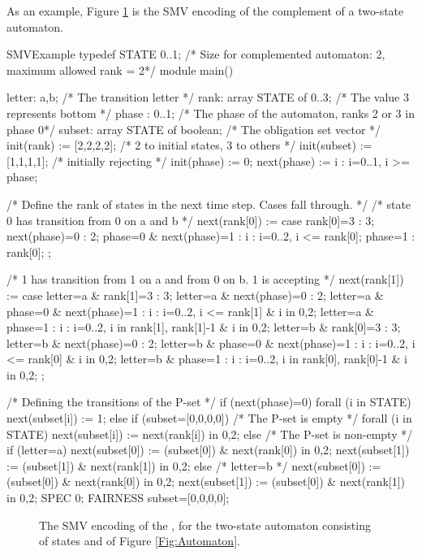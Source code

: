 \documentclass{LMCS}
\begin{document}
As an example, Figure \ref{Fig:SMV_Encoding} is the SMV encoding of the complement of a two-state automaton.


{
\begin{SaveVerbatim}{SMVExample}
typedef STATE 0..1;  /* Size for complemented automaton: 2, maximum allowed rank = 2*/
module main() { 
 letter: {a,b};                   /* The transition letter */
 rank: array STATE of 0..3;       /* The value 3 represents bottom */
 phase : 0..1;                    /* The phase of the automaton, ranks 2 or 3 in phase 0*/
 subset: array STATE of boolean;  /* The obligation set vector */
 init(rank) := [2,2,2,2];         /* 2 to initial states, 3 to others */
 init(subset) := [1,1,1,1];       /* initially rejecting */
 init(phase) := 0;
 next(phase) := {i : i=0..1, i >= phase}; 

 /* Define the rank of states in the next time step. Cases fall through. */
 /* state 0 has transition from 0 on a and b */
 next(rank[0]) := case {
     rank[0]=3 : 3;
     next(phase)=0 : 2; 
     phase=0 & next(phase)=1 : {i : i=0..2, i <= rank[0]};
     phase=1 : rank[0];
 };

 /* 1 has transition from 1 on a and from 0 on b. 1 is accepting */
 next(rank[1]) := case {
    letter=a & rank[1]=3 : 3;
    letter=a & next(phase)=0 : 2;
    letter=a & phase=0 & next(phase)=1 : {i : i=0..2, i <= rank[1] & i in {0,2}};
    letter=a & phase=1 : {i : i=0..2, i in {rank[1], rank[1]-1} & i in {0,2}};
    letter=b & rank[0]=3 : 3;
    letter=b & next(phase)=0 : 2;
    letter=b & phase=0 & next(phase)=1 : {i : i=0..2, i <= rank[0] & i in {0,2}};
    letter=b & phase=1 : {i : i=0..2, i in {rank[0], rank[0]-1} & i in {0,2}};
 };

 
 /* Defining the transitions of the P-set */
 if (next(phase)=0)  {
     forall (i in STATE) next(subset[i]) := 1;
 } else {
   if (subset=[0,0,0,0]) { /* The P-set is empty */
     forall (i in STATE) next(subset[i]) := next(rank[i]) in {0,2};
   } else { /* The P-set is non-empty */
     if (letter=a) {
       next(subset[0]) := (subset[0]) & next(rank[0]) in {0,2};
       next(subset[1]) := (subset[1]) & next(rank[1]) in {0,2};
     } else { /* letter=b */
       next(subset[0]) := (subset[0]) & next(rank[0]) in {0,2};
       next(subset[1]) := (subset[0]) & next(rank[1]) in {0,2};
 }}} 
SPEC 0;
 FAIRNESS subset=[0,0,0,0];
}
\end{SaveVerbatim}
}


\begin{figure}[htbp]
			\caption{The SMV encoding of the , for the two-state
automaton consisting of states  and  of Figure \ref{Fig:Automaton}.}
			\label{Fig:SMV_Encoding}
\end{figure}
\end{document}
